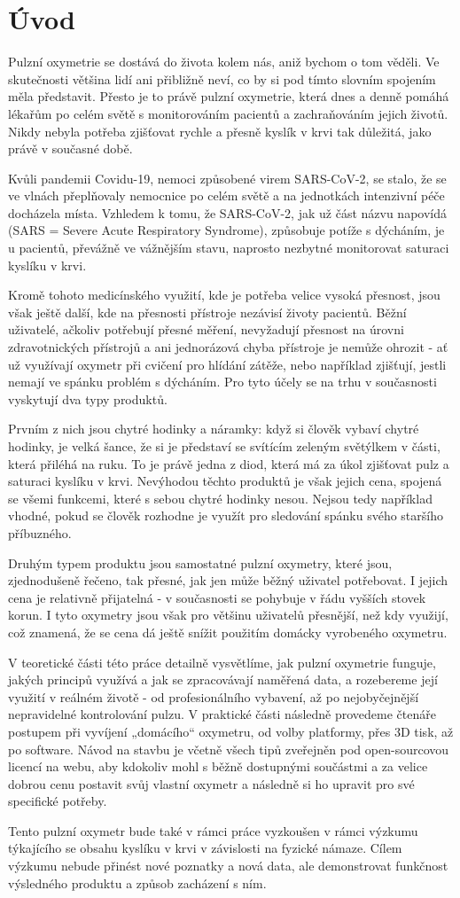 \newpage
\part{Úvod}
Pulzní oxymetrie se dostává do života kolem nás, aniž bychom o tom věděli. Ve skutečnosti většina lidí ani přibližně neví, co by si pod tímto slovním spojením měla představit. Přesto je to právě pulzní oxymetrie, která dnes a denně pomáhá lékařům po celém světě s monitorováním pacientů a zachraňováním jejich životů. Nikdy nebyla potřeba zjišťovat rychle a přesně kyslík v krvi tak důležitá, jako právě v současné době.
\par Kvůli pandemii Covidu-19, nemoci způsobené virem SARS-CoV-2, se stalo, že se ve vlnách přeplňovaly nemocnice po celém světě a na jednotkách intenzivní péče docházela místa. Vzhledem k tomu, že SARS-CoV-2, jak už část názvu napovídá (SARS = Severe Acute Respiratory Syndrome), způsobuje potíže s dýcháním, je u pacientů, převážně ve vážnějším stavu, naprosto nezbytné monitorovat saturaci kyslíku v krvi.
\par Kromě tohoto medicínského využití, kde je potřeba velice vysoká přesnost, jsou však ještě další, kde na přesnosti přístroje nezávisí životy pacientů. Běžní uživatelé, ačkoliv potřebují přesné měření, nevyžadují přesnost na úrovni zdravotnických přístrojů a ani jednorázová chyba přístroje je nemůže ohrozit - ať už využívají oxymetr při cvičení pro hlídání zátěže, nebo například zjišťují, jestli nemají ve spánku problém s dýcháním. Pro tyto účely se na trhu v současnosti vyskytují dva typy produktů.
\par Prvním z nich jsou chytré hodinky a náramky: když si člověk vybaví chytré hodinky, je velká šance, že si je představí se svítícím zeleným světýlkem v části, která přiléhá na ruku. To je právě jedna z diod, která má za úkol zjišťovat pulz a saturaci kyslíku v krvi. Nevýhodou těchto produktů je však jejich cena, spojená se všemi funkcemi, které s sebou chytré hodinky nesou. Nejsou tedy například vhodné, pokud se člověk rozhodne je využít pro sledování spánku svého staršího příbuzného.
\par Druhým typem produktu jsou samostatné pulzní oxymetry, které jsou, zjednodušeně řečeno, tak přesné, jak jen může běžný uživatel potřebovat. I jejich cena je relativně přijatelná - v současnosti se pohybuje v řádu vyšších stovek korun. I tyto oxymetry jsou však pro většinu uživatelů přesnější, než kdy využijí, což znamená, že se cena dá ještě snížit použitím domácky vyrobeného oxymetru.
\par V teoretické části této práce detailně vysvětlíme, jak pulzní oxymetrie funguje, jakých principů využívá a jak se zpracovávají naměřená data, a rozebereme její využití v reálném životě - od profesionálního vybavení, až po nejobyčejnější nepravidelné kontrolování pulzu. V praktické části následně provedeme čtenáře postupem při vyvíjení „domácího“ oxymetru, od volby platformy, přes 3D tisk, až po software. Návod na stavbu je včetně všech tipů zveřejněn pod open-sourcovou licencí na webu, aby kdokoliv mohl s běžně dostupnými součástmi a za velice dobrou cenu postavit svůj vlastní oxymetr a následně si ho upravit pro své specifické potřeby.
\par Tento pulzní oxymetr bude také v rámci práce vyzkoušen v rámci výzkumu týkajícího se obsahu kyslíku v krvi v závislosti na fyzické námaze. Cílem výzkumu nebude přinést nové poznatky a nová data, ale demonstrovat funkčnost výsledného produktu a způsob zacházení s ním.